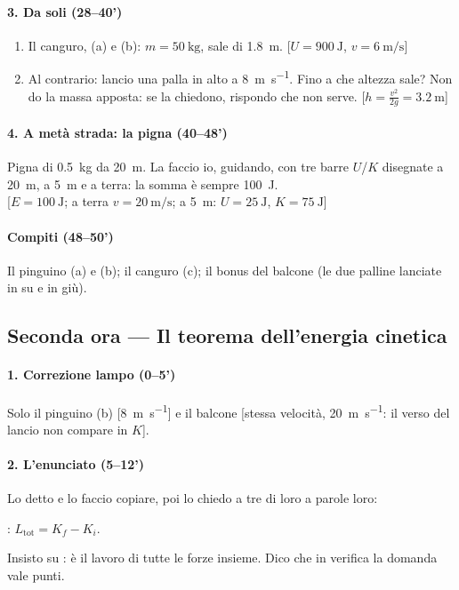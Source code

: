 \documentclass[11pt]{report}
\begin{document}
\paragraph{3. Da soli (28--40')}
\begin{enumerate}
  \item Il canguro, (a) e (b): $m=\SI{50}{\kilogram}$, sale di \SI{1.8}{\metre}. [$U=\SI{900}{\joule}$, $v=\SI{6}{\metre\per\second}$]
  \item Al contrario: lancio una palla in alto a \SI{8}{\metre\per\second}. Fino a che altezza sale? Non do la massa apposta: se la chiedono, rispondo che non serve. [$h=\frac{v^2}{2g}=\SI{3.2}{\metre}$]
\end{enumerate}

\paragraph{4. A metà strada: la pigna (40--48')}
Pigna di \SI{0.5}{\kilogram} da \SI{20}{\metre}. La faccio io, guidando, con tre barre $U$/$K$ disegnate a \SI{20}{\metre}, a \SI{5}{\metre} e a terra: la somma è sempre \SI{100}{\joule}.\\
{}[$E=\SI{100}{\joule}$; a terra $v=\SI{20}{\metre\per\second}$; a \SI{5}{\metre}: $U=\SI{25}{\joule}$, $K=\SI{75}{\joule}$]

\paragraph{Compiti (48--50')}
Il pinguino (a) e (b); il canguro (c); il bonus del balcone (le due palline lanciate in su e in giù).

\subsection*{Seconda ora --- Il teorema dell'energia cinetica}

\paragraph{1. Correzione lampo (0--5')}
Solo il pinguino (b) [\SI{8}{\metre\per\second}] e il balcone [stessa velocità, \SI{20}{\metre\per\second}: il verso del lancio non compare in $K$].

\paragraph{2. L'enunciato (5--12')}
Lo detto e lo faccio copiare, poi lo chiedo a tre di loro a parole loro:
\begin{center}
: $L_{\text{tot}}=K_f-K_i$.
\end{center}
Insisto su : è il lavoro di tutte le forze insieme. Dico che in verifica la domanda  vale punti.
\end{document}
